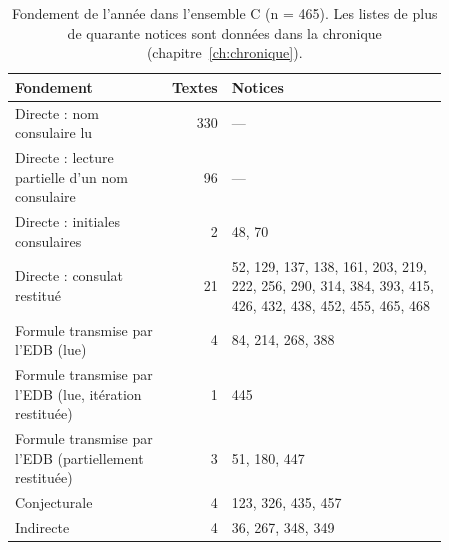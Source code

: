 \begin{table}[tbp]\centering\small\caption{Fondement de l’année dans l’ensemble C (n = 465). Les listes de plus de quarante notices sont données dans la chronique (chapitre~\ref{ch:chronique}).}\label{tab:datation}
\begin{tabular}{@{}p{0.36\linewidth} r p{0.5\linewidth}@{}}\toprule Fondement & Textes & Notices\\\midrule
Directe : nom consulaire lu & 330 & {\footnotesize —} \\
Directe : lecture partielle d’un nom consulaire & 96 & {\footnotesize —} \\
Directe : initiales consulaires & 2 & {\footnotesize 48, 70} \\
Directe : consulat restitué & 21 & {\footnotesize 52, 129, 137, 138, 161, 203, 219, 222, 256, 290, 314, 384, 393, 415, 426, 432, 438, 452, 455, 465, 468} \\
Formule transmise par l’EDB (lue) & 4 & {\footnotesize 84, 214, 268, 388} \\
Formule transmise par l’EDB (lue, itération restituée) & 1 & {\footnotesize 445} \\
Formule transmise par l’EDB (partiellement restituée) & 3 & {\footnotesize 51, 180, 447} \\
Conjecturale & 4 & {\footnotesize 123, 326, 435, 457} \\
Indirecte & 4 & {\footnotesize 36, 267, 348, 349} \\
\bottomrule\end{tabular}\end{table}
